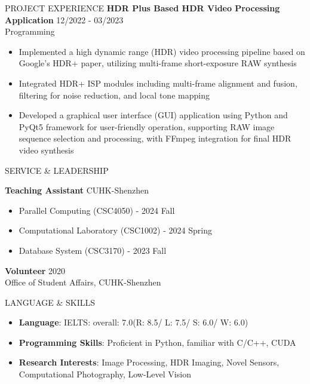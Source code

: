 \documentclass{resume} %
\begin{document}
\begin{rSection}{PROJECT EXPERIENCE}
\textbf{HDR Plus Based HDR Video Processing Application} \hfill 12/2022 - 03/2023\\
Programming
\begin{itemize}
    \setlength{\itemsep}{0pt}
    \setlength{\parsep}{0pt}
    \setlength{\parskip}{0pt}
    \item Implemented a high dynamic range (HDR) video processing pipeline based on Google's HDR+ paper, utilizing multi-frame short-exposure RAW synthesis
    \item Integrated HDR+ ISP modules including multi-frame alignment and fusion, filtering for noise reduction, and local tone mapping
    \item Developed a graphical user interface (GUI) application using Python and PyQt5 framework for user-friendly operation, supporting RAW image sequence selection and processing, with FFmpeg integration for final HDR video synthesis
\end{itemize}

\end{rSection} 


\begin{rSection}{SERVICE \& LEADERSHIP}

\setlength{\parskip}{1.5pt}

\textbf{Teaching Assistant} \hfill CUHK-Shenzhen
\begin{itemize}
    \setlength{\itemsep}{0pt}
    \setlength{\parsep}{0pt}
    \setlength{\parskip}{0pt}
    \item Parallel Computing (CSC4050) - 2024 Fall
    \item Computational Laboratory (CSC1002) - 2024 Spring
    \item Database System (CSC3170) - 2023 Fall
\end{itemize}

\textbf{Volunteer} \hfill 2020\\
Office of Student Affairs, CUHK-Shenzhen

\end{rSection}

\begin{rSection}{LANGUAGE \& SKILLS} 
\begin{itemize}
    \setlength{\itemsep}{0pt}
    \setlength{\parsep}{0pt}
    \setlength{\parskip}{0pt}
    \item \textbf{Language}: IELTS: overall: 7.0(R: 8.5/ L: 7.5/ S: 6.0/ W: 6.0)
    \item \textbf{Programming Skills}: Proficient in Python, familiar with C/C++, CUDA
    \item \textbf{Research Interests}: Image Processing, HDR Imaging, Novel Sensors, Computational Photography, Low-Level Vision
\end{itemize}

\end{rSection}
\end{document}
